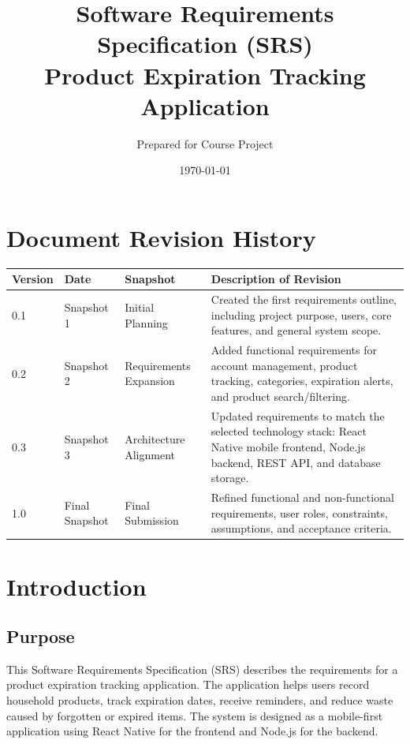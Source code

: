 \documentclass[12pt]{article}
\title{Software Requirements Specification (SRS)\\Product Expiration Tracking Application}
\author{Prepared for Course Project}
\date{\today}
\begin{document}
\maketitle
\newpage
\tableofcontents
\newpage

\section*{Document Revision History}

\begin{longtable}{|p{}|p{}|p{}|p{}|}
\hline
\textbf{Version} & \textbf{Date} & \textbf{Snapshot} & \textbf{Description of Revision} \\
\hline
0.1 & Snapshot 1 & Initial Planning & Created the first requirements outline, including project purpose, users, core features, and general system scope. \\
\hline
0.2 & Snapshot 2 & Requirements Expansion & Added functional requirements for account management, product tracking, categories, expiration alerts, and product search/filtering. \\
\hline
0.3 & Snapshot 3 & Architecture Alignment & Updated requirements to match the selected technology stack: React Native mobile frontend, Node.js backend, REST API, and database storage. \\
\hline
1.0 & Final Snapshot & Final Submission & Refined functional and non-functional requirements, user roles, constraints, assumptions, and acceptance criteria. \\
\hline
\end{longtable}

\section{Introduction}

\subsection{Purpose}
This Software Requirements Specification (SRS) describes the requirements for a product expiration tracking application. The application helps users record household products, track expiration dates, receive reminders, and reduce waste caused by forgotten or expired items. The system is designed as a mobile-first application using React Native for the frontend and Node.js for the backend.
\end{document}
